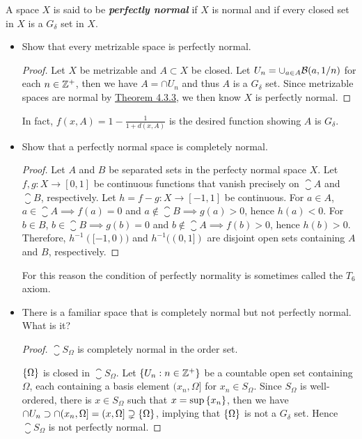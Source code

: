 \documentclass[12pt,a4paper]{article}
\begin{document}
    \begin{ex}
        A space $X$ is said to be \textit{\textbf{perfectly normal}} if $X$ is normal and if every closed set in $X$ is a $G_\delta$ set in $X$.
        \begin{itemize}
            \item Show that every metrizable space is perfectly normal.
            \begin{proof}
                Let $X$ be metrizable and $A\subset X$ be closed. Let $U_n=\cup_{a\in A}\mathcal{B}(a,1/n)$ for each $n\in\mathbb{Z}^+$, then we have $A=\cap U_n$ and thus $A$ is a $G_\delta$ set. Since metrizable spaces are normal by \hyperref[4.3.3]{Theorem 4.3.3}, we then know $X$ is perfectly normal.
            \end{proof}
            \begin{remark}
                In fact, $f(x,A)=1-\frac{1}{1+d(x,A)}$ is the desired function showing $A$ is $G_\delta$.
            \end{remark}
            \item Show that a perfectly normal space is completely normal.
            \begin{proof}
                Let $A$ and $B$ be separated sets in the perfecty normal space $X$. Let $f,g:X\to [0,1]$ be continuous functions that vanish precisely on $\closure{A}$ and $\closure{B}$, respectively. Let $h=f-g:X\to [-1,1]$ be continuous. For $a\in A$, $a\in\closure{A}\implies f(a)=0$ and $a\notin\closure{B}\implies g(a)>0$, hence $h(a)<0$. For $b\in B$, $b\in\closure{B}\implies g(b)=0$ and $b\notin\closure{A}\implies f(b)>0$, hence $h(b)>0$. Therefore, $h^{-1}([-1,0))$ and $h^{-1}((0,1])$ are disjoint open sets containing $A$ and $B$, respectively.
            \end{proof}
            \begin{remark}
                For this reason the condition of perfectly normality is sometimes called the $T_6$ axiom.
            \end{remark}
            \item There is a familiar space that is completely normal but not perfectly normal. What is it?
            \begin{proof}
                $\closure{S}_\Omega$ is completely normal in the order set. 
                
                $\left\{\Omega\right\}$ is closed in $\closure{S}_\Omega$. Let $\left\{U_n:n\in\mathbb{Z}^+\right\}$ be a countable open set containing $\Omega$, each containing a basis element $(x_n,\Omega]$ for $x_n\in S_\Omega$. Since $S_\Omega$ is well-ordered, there is $x\in S_\Omega$ such that $x=\sup\left\{x_n\right\}$, then we have $\cap U_n\supset \cap (x_n,\Omega]=(x,\Omega]\supsetneq\left\{\Omega\right\}$, implying that $\left\{\Omega\right\}$ is not a $G_\delta$ set. Hence $\closure{S}_\Omega$ is not perfectly normal.
            \end{proof}
        \end{itemize}
    \end{ex}
    \hfill
\end{document}
